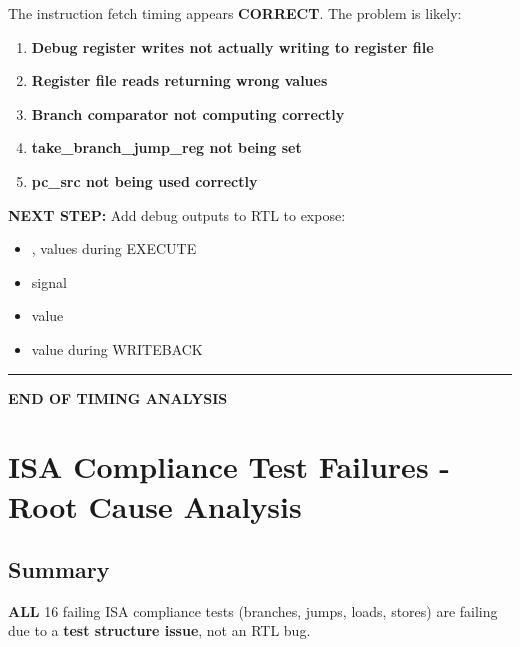 \begin{record}

The instruction fetch timing appears \textbf{CORRECT}. The problem is
likely:

\begin{enumerate}
\def\labelenumi{\arabic{enumi}.}
\tightlist
\item
  \textbf{Debug register writes not actually writing to register file}
\item
  \textbf{Register file reads returning wrong values}
\item
  \textbf{Branch comparator not computing correctly}
\item
  \textbf{take\_\allowbreak{}branch\_\allowbreak{}jump\_\allowbreak{}reg
  not being set}
\item
  \textbf{pc\_src not being used correctly}
\end{enumerate}

\textbf{NEXT STEP:} Add debug outputs to RTL to expose:

\begin{itemize}
\tightlist
\item
  ,  values during EXECUTE
\item
   signal
\item
   value
\item
   value during WRITEBACK
\end{itemize}

\begin{center}\rule{0.5\linewidth}{0.5pt}\end{center}

\textbf{END OF TIMING ANALYSIS}

\end{record}

\section{ISA Compliance Test Failures - Root Cause Analysis}\label{cr:fix:rtl-isa-test-fix}

\subsection{Summary}\label{cr:fix:rtl-isa-test-fix:summary}

\begin{record}

\textbf{ALL} 16 failing ISA compliance tests (branches, jumps, loads,
stores) are failing due to a \textbf{test structure issue}, not an RTL
bug.

\end{record}

